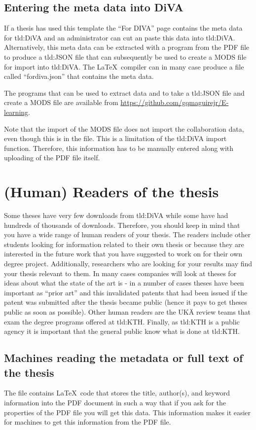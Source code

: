 \subsection{Entering the meta data into DiVA}
If a thesis has used this template the ``For DIVA'' page contains the meta data for \gls{tld:DiVA} and an administrator can cut an paste this data into \gls{tld:DiVA}. Alternatively, this meta data can be extracted with a program from the PDF file to produce a \gls{tld:JSON} file that can subsequently be used to create a MODS file for import into \gls{tld:DiVA}. The \LaTeX\ compiler can in many case produce a file called ``fordiva.json'' that contains the meta data.

The programs that can be used to extract data and to take a \gls{tld:JSON} file and create a MODS file are available from \url{https://github.com/gqmaguirejr/E-learning}.

Note that the import of the MODS file does not import the collaboration data, even though this is in the file. This is a limitation of the \gls{tld:DiVA} import function. Therefore, this information has to be manually entered along with uploading of the PDF file itself.

\section{(Human) Readers of the thesis}
\label{sec:readers}
Some theses have very few downloads from \gls{tld:DiVA} while some have had hundreds of thousands of downloads. Therefore, you should keep in mind that you have a wide range of human readers of your thesis. The readers include other students looking for information related to their own thesis or because they are interested in the future work that you have suggested to work on for their own degree project. Additionally, researchers who are looking for your results may find your thesis relevant to them. In many cases companies will look at theses for ideas about what the state of the art is - in a number of cases theses have been important as ``prior art'' and this invalidated patents that had been issued if the patent was submitted after the thesis became public (hence it pays to get theses public as soon as possible). Other human readers are the UKÄ review teams that exam the degree programs offered at \gls{tld:KTH}. Finally, as \gls{tld:KTH} is a public agency it is important that the general public know what is done at \gls{tld:KTH}.

\subsection{Machines reading the metadata or full text of the thesis}
\label{sec:searchEngines}
The file  contains \LaTeX\ code that stores the title, author(s), and keyword information into the PDF document in such a way that if you ask for the properties of the PDF file you will get this data. This information makes it easier for machines to get this information from the PDF file. 

